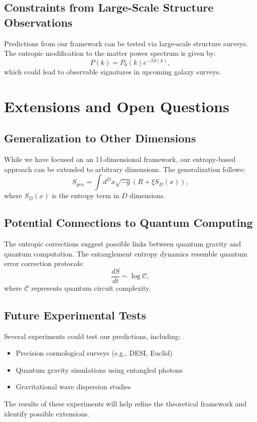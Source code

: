 \documentclass{article}
\begin{document}
\subsection{Constraints from Large-Scale Structure Observations}
Predictions from our framework can be tested via large-scale structure surveys. The entropic modification to the matter power spectrum is given by:
\begin{equation}
P(k) = P_0(k) e^{-\beta S(k)},
\end{equation}
which could lead to observable signatures in upcoming galaxy surveys.

\section{Extensions and Open Questions}

\subsection{Generalization to Other Dimensions}
While we have focused on an 11-dimensional framework, our entropy-based approach can be extended to arbitrary dimensions. The generalization follows:
\begin{equation}
S_{gen} = \int d^D x \sqrt{-g} \left( R + \xi S_{D}(x) \right),
\end{equation}
where $S_D(x)$ is the entropy term in $D$ dimensions.

\subsection{Potential Connections to Quantum Computing}
The entropic corrections suggest possible links between quantum gravity and quantum computation. The entanglement entropy dynamics resemble quantum error correction protocols:
\begin{equation}
\frac{dS}{dt} \sim \log \mathcal{C},
\end{equation}
where $\mathcal{C}$ represents quantum circuit complexity.

\subsection{Future Experimental Tests}
Several experiments could test our predictions, including:
\begin{itemize}
    \item Precision cosmological surveys (e.g., DESI, Euclid)
    \item Quantum gravity simulations using entangled photons
    \item Gravitational wave dispersion studies
\end{itemize}

The results of these experiments will help refine the theoretical framework and identify possible extensions.
\end{document}

